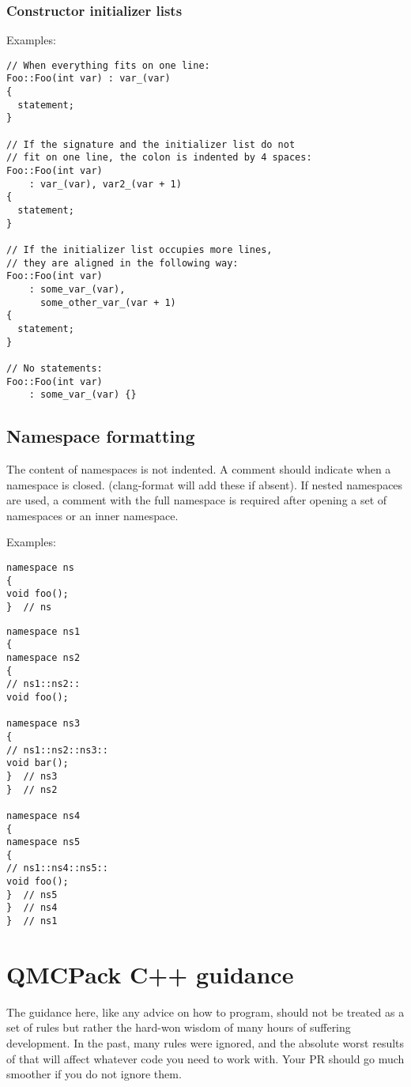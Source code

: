\subsubsection{Constructor initializer lists}

Examples:
\begin{lstlisting}
// When everything fits on one line:
Foo::Foo(int var) : var_(var) 
{
  statement;
}

// If the signature and the initializer list do not
// fit on one line, the colon is indented by 4 spaces:
Foo::Foo(int var)
    : var_(var), var2_(var + 1)
{
  statement;
}

// If the initializer list occupies more lines,
// they are aligned in the following way:
Foo::Foo(int var)
    : some_var_(var),
      some_other_var_(var + 1) 
{
  statement;
}

// No statements:
Foo::Foo(int var)
    : some_var_(var) {}
\end{lstlisting}

\subsection{Namespace formatting}
The content of namespaces is not indented.
A comment should indicate when a namespace is closed. (clang-format will add these if absent).
If nested namespaces are used, a comment with the full namespace is required after opening a set of namespaces or an inner namespace.

Examples:
\begin{lstlisting}
namespace ns
{
void foo();
}  // ns
\end{lstlisting}

\begin{lstlisting}
namespace ns1
{
namespace ns2
{
// ns1::ns2::
void foo();

namespace ns3
{
// ns1::ns2::ns3::
void bar();
}  // ns3
}  // ns2

namespace ns4
{
namespace ns5
{
// ns1::ns4::ns5::
void foo();
}  // ns5
}  // ns4
}  // ns1
\end{lstlisting}


\section{QMCPack C++ guidance}
The guidance here, like any advice on how to program, should not be treated as a set of rules but rather the hard-won wisdom of many hours of suffering development. In the past, many rules were ignored, and the absolute worst results of that will affect whatever code you need to work with. Your PR should go much smoother if you do not ignore them.

